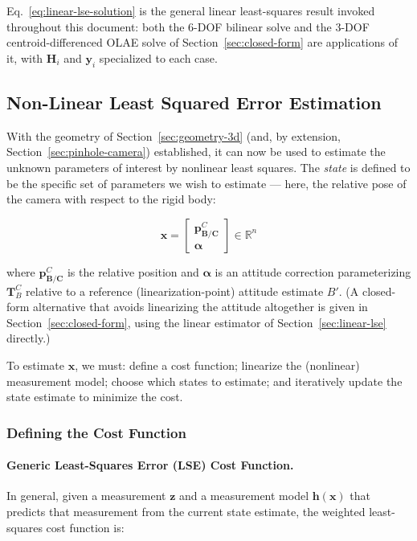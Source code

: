 \documentclass{article}
\newcommand{\vect}[1]{\mathbf{#1}}
\newcommand{\mat}[1]{\mathbf{#1}}
\newcommand{\TCB}{\mat{T}^C_{B}}
\newcommand{\pBCC}{\vect{p}^{\mathit{C}}_{\mathbf{B}/\mathbf{C}}}
\newcommand{\rotErr}{\vect{\alpha}} %
\newcommand{\stateVec}{\vect{x}}
\begin{document}
Eq.~\eqref{eq:linear-lse-solution} is the general linear least-squares result invoked throughout this document: both the 6-DOF bilinear solve and the 3-DOF centroid-differenced OLAE solve of Section~\ref{sec:closed-form} are applications of it, with $\mat{H}_i$ and $\vect{y}_i$ specialized to each case.

\subsection{Non-Linear Least Squared Error Estimation}
\label{sec:nlls-estimation}

With the geometry of Section~\ref{sec:geometry-3d} (and, by extension, Section~\ref{sec:pinhole-camera}) established, it can now be used to estimate the unknown parameters of interest by nonlinear least squares. The \emph{state} is defined to be the specific set of parameters we wish to estimate --- here, the relative pose of the camera with respect to the rigid body:

\begin{equation}
    \stateVec = \begin{bmatrix} \pBCC \\ \rotErr \end{bmatrix} \in \mathbb{R}^n
\end{equation}

where $\pBCC$ is the relative position and $\rotErr$ is an attitude correction parameterizing $\TCB$ relative to a reference (linearization-point) attitude estimate $B'$. (A closed-form alternative that avoids linearizing the attitude altogether is given in Section~\ref{sec:closed-form}, using the linear estimator of Section~\ref{sec:linear-lse} directly.)

To estimate $\stateVec$, we must: define a cost function; linearize the (nonlinear) measurement model; choose which states to estimate; and iteratively update the state estimate to minimize the cost.

\subsubsection{Defining the Cost Function}

\paragraph{Generic Least-Squares Error (LSE) Cost Function.}

In general, given a measurement $\vect{z}$ and a measurement model $\vect{h}(\stateVec)$ that predicts that measurement from the current state estimate, the weighted least-squares cost function is:
\end{document}
